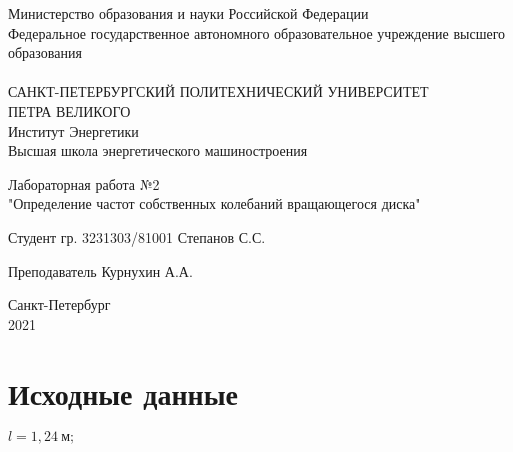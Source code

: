 




\begin{titlepage}

\begin{center}
Министерство образования и науки Российской Федерации\\
Федеральное государственное автономного образовательное учреждение высшего образования\\
\hrulefill\\
\vspace{0.5cm}
САНКТ-ПЕТЕРБУРГСКИЙ ПОЛИТЕХНИЧЕСКИЙ УНИВЕРСИТЕТ\\ ПЕТРА ВЕЛИКОГО\\
\vspace{0.5cm}
Институт Энергетики\\
Высшая школа энергетического машиностроения\\

\end{center}

\vspace{5cm}
\begin{center}
\begin{large}
Лабораторная работа №2\\
"Определение частот собственных колебаний вращающегося диска"
\end{large}
\end{center}

\vspace{5cm}
\hspace{5cm} Студент гр. 3231303/81001 \hrulefill Степанов С.С.


\vspace{0.5cm}
\hspace{5cm} Преподаватель \hrulefill Курнухин А.А. \\


\vfill
\begin{center}
Санкт-Петербург\\
2021
\end{center}


\end{titlepage}

\tableofcontents
\newpage

\section{Исходные данные}

\(l = 1,24\ м;\)

